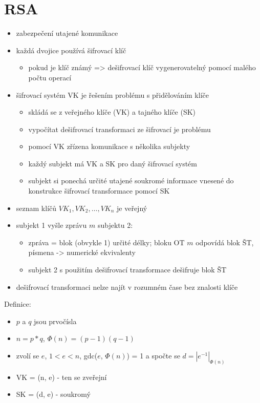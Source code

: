 \documentclass{szzclass}
\author{Jakub Rathouský}
\begin{document}
\tableofcontents
\newpage


\section{RSA}
\begin{itemize}
    \item zabezpečení utajené komunikace
    \item každá dvojice používá šifrovací klíč
    \begin{itemize}
        \item pokud je klíč známý => dešifrovací klíč vygenerovatelný pomocí malého počtu operací
    \end{itemize}
    \item šifrovací systém VK je řešením problému s přidělováním klíče
    \begin{itemize}
        \item skládá se z veřejného klíče (VK) a tajného klíče (SK)
        \item vypočítat dešifrovací transformaci ze šifrovací je problému
        \item pomocí VK zřízena komunikace s několika subjekty
        \item každý subjekt má VK a SK pro daný šifrovací systém
        \item subjekt si ponechá určité utajené soukromé informace vnesené do konstrukce šifrovací transformace pomocí SK
    \end{itemize}
    \item seznam klíčů $VK_1, VK_2,\dots,VK_n$ je veřejný
    \item subjekt 1 vyšle zprávu $m$ subjektu 2:
    \begin{itemize}
        \item zpráva = blok (obvykle 1) určité délky; bloku OT $m$ odpovídá blok ŠT, písmena -> numerické ekvivalenty
        \item subjekt 2 s použitím dešifrovací transformace dešifruje blok ŠT
    \end{itemize}
    \item dešifrovací transformaci nelze najít v rozumném čase bez znalosti klíče
\end{itemize}
Definice:
\begin{itemize}
    \item $p$ a $q$ jsou prvočísla
    \item $n = p*q$, $\Phi(n) = (p - 1)(q - 1)$
    \item zvolí se $e$, $1 < e < n$, gdc($e$, $\Phi(n)$) = 1 a spočte se $d = |e^{-1}|_{\Phi(n)}$
    \item VK = (n, e) - ten se zveřejní
    \item SK = (d, e) - soukromý
\end{itemize}
\end{document}
